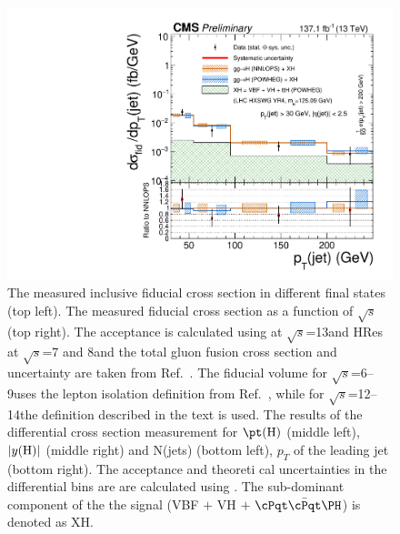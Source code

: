 \begin{figure}[!htb]
        \includegraphics[width=0.45\linewidth]{Figures/results/fiducial/comb/pt_leadingjet_pt30_eta2p5_unfoldwith_SM_125_logscale.pdf}
        \caption{
            The measured inclusive fiducial cross section in different final states (top left). The measured fiducial cross section as a function of $\sqrt{s}$ (top right).  
                The acceptance is calculated using \POWHEG at  $\sqrt{s}$=13\TeV and {\sc HRes}~\cite{Grazzini:2013mca,deFlorian:2012mx} 
                at  $\sqrt{s}$=7 and 8\TeV and the total gluon fusion cross section and uncertainty are taken from 
                Ref.~\cite{Anastasiou2016}. The fiducial volume for $\sqrt{s}$=6--9\TeV uses the lepton isolation definition from 
                Ref.~\cite{CMSH4lFiducial8TeV}, while for $\sqrt{s}$=12--14\TeV the definition described in the text is used.
                The results of the differential cross section measurement for $\pt({\rm H})$ (middle left), $|y({\rm H})|$ (middle right) and N(jets) (bottom left), $p_T$ of the leading jet (bottom right). The acceptance and theoreti
cal uncertainties in the differential bins are are calculated using \POWHEG. 
                The sub-dominant component of the the signal (VBF $+$ VH $+~\ttH$) is denoted as XH. 
                \label{fig:fiducialresult}}
\end{figure}



